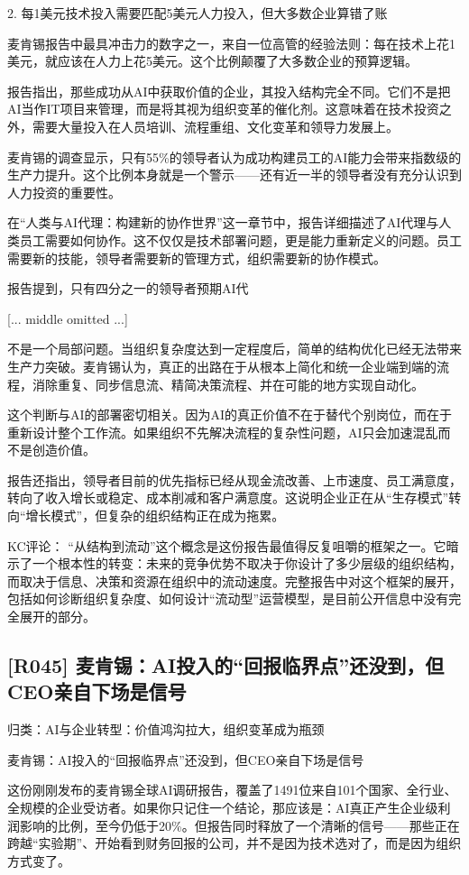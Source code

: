 \documentclass[11pt]{ctexart}
\begin{document}
2. 每1美元技术投入需要匹配5美元人力投入，但大多数企业算错了账

麦肯锡报告中最具冲击力的数字之一，来自一位高管的经验法则：每在技术上花1美元，就应该在人力上花5美元。这个比例颠覆了大多数企业的预算逻辑。

报告指出，那些成功从AI中获取价值的企业，其投入结构完全不同。它们不是把AI当作IT项目来管理，而是将其视为组织变革的催化剂。这意味着在技术投资之外，需要大量投入在人员培训、流程重组、文化变革和领导力发展上。

麦肯锡的调查显示，只有55\%的领导者认为成功构建员工的AI能力会带来指数级的生产力提升。这个比例本身就是一个警示——还有近一半的领导者没有充分认识到人力投资的重要性。

在“人类与AI代理：构建新的协作世界”这一章节中，报告详细描述了AI代理与人类员工需要如何协作。这不仅仅是技术部署问题，更是能力重新定义的问题。员工需要新的技能，领导者需要新的管理方式，组织需要新的协作模式。

报告提到，只有四分之一的领导者预期AI代

[... middle omitted ...]

不是一个局部问题。当组织复杂度达到一定程度后，简单的结构优化已经无法带来生产力突破。麦肯锡认为，真正的出路在于从根本上简化和统一企业端到端的流程，消除重复、同步信息流、精简决策流程、并在可能的地方实现自动化。

这个判断与AI的部署密切相关。因为AI的真正价值不在于替代个别岗位，而在于重新设计整个工作流。如果组织不先解决流程的复杂性问题，AI只会加速混乱而不是创造价值。

报告还指出，领导者目前的优先指标已经从现金流改善、上市速度、员工满意度，转向了收入增长或稳定、成本削减和客户满意度。这说明企业正在从“生存模式”转向“增长模式”，但复杂的组织结构正在成为拖累。

KC评论： “从结构到流动”这个概念是这份报告最值得反复咀嚼的框架之一。它暗示了一个根本性的转变：未来的竞争优势不取决于你设计了多少层级的组织结构，而取决于信息、决策和资源在组织中的流动速度。完整报告中对这个框架的展开，包括如何诊断组织复杂度、如何设计“流动型”运营模型，是目前公开信息中没有完全展开的部分。

\subsection{[R045] 麦肯锡：AI投入的“回报临界点”还没到，但CEO亲自下场是信号}
{\small\color{refgray}归类：AI与企业转型：价值鸿沟拉大，组织变革成为瓶颈}

麦肯锡：AI投入的“回报临界点”还没到，但CEO亲自下场是信号

这份刚刚发布的麦肯锡全球AI调研报告，覆盖了1491位来自101个国家、全行业、全规模的企业受访者。如果你只记住一个结论，那应该是：AI真正产生企业级利润影响的比例，至今仍低于20\%。但报告同时释放了一个清晰的信号——那些正在跨越“实验期”、开始看到财务回报的公司，并不是因为技术选对了，而是因为组织方式变了。
\end{document}
